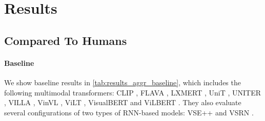 \section{Results} \label{sec:winoground_results}

\subsection{Compared To Humans}

\paragraph{Baseline}

We show baseline results in \cref{tab:results_aggr_baseline}, which includes the following multimodal transformers: CLIP \cite{radford2021clip}, FLAVA \cite{singh2022flava}, LXMERT \cite{tan2020lxmert}, UniT \cite{hu2021unit}, UNITER \cite{chen2020uniter}, VILLA \cite{gan2020villa}, VinVL \cite{zhang2021vinvl}, ViLT \cite{kim2021vilt}, VisualBERT \cite{li2019visualbert} and ViLBERT \cite{lu2019vilbert}. They also evaluate several configurations of two types of RNN-based models: VSE++ \cite{faghri2018vse} and VSRN \cite{li2019vsrn}.

